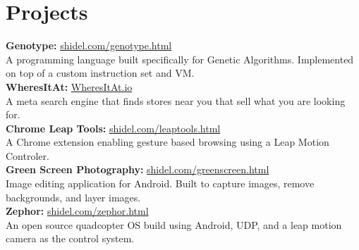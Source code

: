 \documentclass[10pt]{article}
\begin{document}
{\begin{minipage}[t]{0.5\textwidth}
\section{Projects} 

\textbf{Genotype:} \hfill \href{http://shidel.com/genotype.html}{shidel.com/genotype.html}
\vspace{0.5 mm}\\
A programming language built specifically for Genetic Algorithms.  Implemented on top of a custom instruction set and VM. \\


\textbf{WheresItAt:} \hfill \href{http://WheresItAt.io}{WheresItAt.io}
\vspace{0.5 mm}\\
A meta search engine that finds stores near you that sell what you are looking for. \\

\textbf{Chrome Leap Tools:} \hfill \href{http://shidel.com/leaptools.html}{shidel.com/leaptools.html}
\vspace{0.5 mm}\\
A Chrome extension enabling gesture based browsing using a Leap Motion Controler.\\

\textbf{Green Screen Photography:} \hfill \href{http://shidel.com/greenscreen.html}{shidel.com/greenscreen.html}
\vspace{0.5 mm}\\
Image editing application for Android. Built to capture images, remove backgrounds, and
layer images. \\

\textbf{Zephor:} \hfill \href{http://shidel.com/zephor.html}{shidel.com/zephor.html}
\vspace{0.5 mm}\\
An open source quadcopter OS build using Android, UDP, and a leap motion camera as the control system. \\



\end{minipage}}
\end{document}
